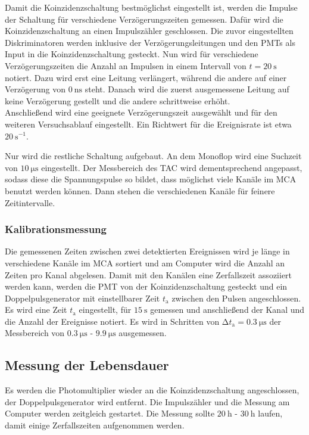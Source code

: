             \noindent Damit die Koinzidenzschaltung bestmöglichst eingestellt ist, werden die Impulse der Schaltung für verschiedene Verzögerungszeiten gemessen. Dafür wird die Koinzidenzschaltung 
            an einen Impulszähler geschlossen. Die zuvor eingestellten Diskriminatoren werden inklusive der Verzögerungsleitungen und den PMTs als Input in die Koinzidenzschaltung gesteckt. 
            Nun wird für verschiedene Verzögerungszeiten die Anzahl an Impulsen in einem Intervall von $t = \SI{20}{\second}$ notiert. Dazu wird erst eine Leitung verlängert, während die andere auf 
            einer Verzögerung von $\SI{0}{\nano\second}$ steht. Danach wird die zuerst ausgemessene Leitung auf keine Verzögerung gestellt und die andere schrittweise erhöht. \\ 
            Anschließend wird eine geeignete Verzögerungszeit ausgewählt und für den weiteren Versuchsablauf eingestellt. Ein Richtwert für die Ereignisrate ist etwa $\SI{20}{\second\tothe{-1}}$.
            
    \noindent Nur wird die restliche Schaltung aufgebaut. An dem Monoflop wird eine Suchzeit von $\SI{10}{\micro\second}$ eingestellt. Der Messbereich des TAC wird dementsprechend angepasst, 
    sodass diese die Spannungspulse so bildet, dass möglichst viele Kanäle im MCA benutzt werden können. Dann stehen die verschiedenen Kanäle für feinere Zeitintervalle. 

        \subsubsection{Kalibrationsmessung}

            \noindent Die gemessenen Zeiten zwischen zwei detektierten Ereignissen wird je länge in verschiedene Kanäle im MCA sortiert und am Computer wird die Anzahl an Zeiten pro 
            Kanal abgelesen. Damit mit den Kanälen eine Zerfallszeit assoziiert werden kann, werden die PMT von der Koinzidenzschaltung gesteckt und ein Doppelpulsgenerator mit 
            einstellbarer Zeit $t_\text{a}$ zwischen den Pulsen angeschlossen. \\ 
            Es wird eine Zeit $t_\text{a}$ eingestellt, für $\SI{15}{\second}$ gemessen und anschließend der Kanal und die Anzahl der Ereignisse notiert. Es wird in Schritten von 
            $\increment t_\text{a} = \SI{0.3}{\micro\second}$ der Messbereich von $\SI{0.3}{\micro\second}$ - $\SI{9.9}{\micro\second}$ ausgemessen. 
            

    \subsection{Messung der Lebensdauer}

    \noindent Es werden die Photomultiplier wieder an die Koinzidenzschaltung angeschlossen, der Doppelpulsgenerator wird entfernt. Die Impulszähler und die Messung am Computer 
    werden zeitgleich gestartet. Die Messung sollte $\SI{20}{\hour}$ - $\SI{30}{\hour}$ laufen, damit einige Zerfallszeiten aufgenommen werden. 
